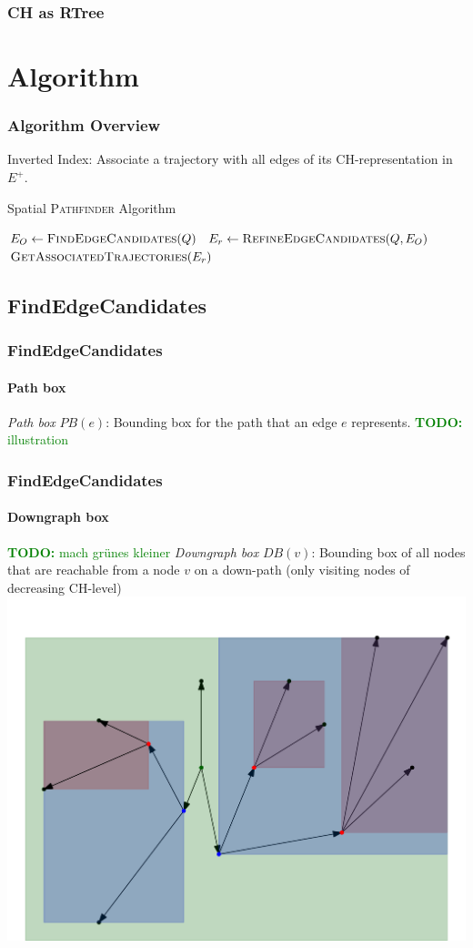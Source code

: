 \documentclass{beamer}
\newcommand{\TODO}[1]{\noindent\textcolor{green}{\textbf{TODO:} #1}}
\newcommand{\pathfinder}{\textsc{Pathfinder}\xspace}
\newcommand{\findEdgeCandidates}{FindEdgeCandidates\xspace}
\newcommand{\refineEdgeCandidates}{RefineEdgeCandidates\xspace}
\newcommand{\getAssociatedTrajectories}{GetAssociatedTrajectories\xspace}
\newcommand{\chrep}{CH-representation\xspace}
\begin{document}
\begin{frame}
	\frametitle{CH as RTree}
\end{frame}

\section{Algorithm}

\begin{frame}
	\frametitle{Algorithm Overview}
	Inverted Index: Associate a trajectory with all edges of its \chrep in $E^+$.
	\begin{algorithm}[H]
		{\small
			\caption{Spatial \pathfinder Algorithm}
			\begin{algorithmic}[1]
				 \pause
				\State $E_O \gets \Call{\findEdgeCandidates}{Q}$ \label{line:edge_revrieval} \pause
				\State $E_r \gets \Call{\refineEdgeCandidates}{Q, E_O}$ \pause
				\State \Return $\Call{\getAssociatedTrajectories}{E_r}$
				\EndProcedure
			\end{algorithmic}
			\label{alg:spatial_pathfinder}
		}
	\end{algorithm}
\end{frame}

\subsection{\findEdgeCandidates}
\begin{frame}
	\frametitle{\findEdgeCandidates}
	\framesubtitle{Path box}
	\emph{Path box} $PB(e)$: Bounding box for the path that an edge $e$ represents.
	\TODO{illustration}
\end{frame}

\begin{frame}
	\frametitle{\findEdgeCandidates}
	\framesubtitle{Downgraph box}
	\TODO{mach grünes kleiner}
	\emph{Downgraph box} $DB(v)$: Bounding box of all nodes that are reachable from a node $v$ on a down-path (only visiting nodes of decreasing CH-level)
	\includegraphics[width=.76\columnwidth]{images/downgraphBox}
\end{frame}
\end{document}
